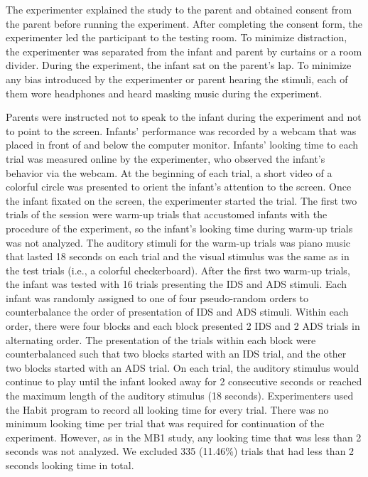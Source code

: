 \documentclass[
  ,man,floatsintext]{apa6}
\begin{document}
The experimenter explained the study to the parent and obtained consent from the parent before running the experiment. After completing the consent form, the experimenter led the participant to the testing room. To minimize distraction, the experimenter was separated from the infant and parent by curtains or a room divider. During the experiment, the infant sat on the parent's lap. To minimize any bias introduced by the experimenter or parent hearing the stimuli, each of them wore headphones and heard masking music during the experiment.

Parents were instructed not to speak to the infant during the experiment and not to point to the screen. Infants' performance was recorded by a webcam that was placed in front of and below the computer monitor. Infants' looking time to each trial was measured online by the experimenter, who observed the infant's behavior via the webcam. At the beginning of each trial, a short video of a colorful circle was presented to orient the infant's attention to the screen. Once the infant fixated on the screen, the experimenter started the trial. The first two trials of the session were warm-up trials that accustomed infants with the procedure of the experiment, so the infant's looking time during warm-up trials was not analyzed. The auditory stimuli for the warm-up trials was piano music that lasted 18 seconds on each trial and the visual stimulus was the same as in the test trials (i.e., a colorful checkerboard). After the first two warm-up trials, the infant was tested with 16 trials presenting the IDS and ADS stimuli. Each infant was randomly assigned to one of four pseudo-random orders to counterbalance the order of presentation of IDS and ADS stimuli. Within each order, there were four blocks and each block presented 2 IDS and 2 ADS trials in alternating order. The presentation of the trials within each block were counterbalanced such that two blocks started with an IDS trial, and the other two blocks started with an ADS trial. On each trial, the auditory stimulus would continue to play until the infant looked away for 2 consecutive seconds or reached the maximum length of the auditory stimulus (18 seconds). Experimenters used the Habit program to record all looking time for every trial. There was no minimum looking time per trial that was required for continuation of the experiment. However, as in the MB1 study, any looking time that was less than 2 seconds was not analyzed. We excluded 335 (11.46\%) trials that had less than 2 seconds looking time in total.
\end{document}
